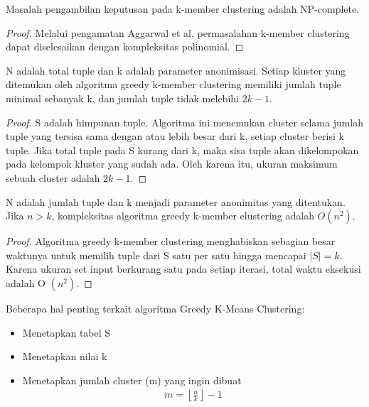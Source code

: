 \begin{theorem}
Masalah pengambilan keputusan pada k-member clustering adalah NP-complete.
\end{theorem}

\begin{proof}
Melalui pengamatan Aggarwal et al, permasalahan k-member clustering dapat diselesaikan dengan kompleksitas polinomial.
\end{proof}

\begin{theorem}
N adalah total tuple dan k adalah parameter anonimisasi. Setiap kluster yang ditemukan oleh algoritma greedy k-member clustering memiliki jumlah tuple minimal sebanyak k, dan jumlah tuple tidak melebihi $2k - 1$.
\end{theorem}

\begin{proof}
S adalah himpunan tuple. Algoritma ini menemukan cluster selama jumlah tuple yang tersisa sama dengan atau lebih besar dari k, setiap cluster berisi k tuple. Jika total tuple pada S kurang dari k, maka sisa tuple akan dikelompokan pada kelompok kluster yang sudah ada. Oleh karena itu, ukuran maksimum sebuah cluster adalah $2k - 1$.
\end{proof}

\begin{theorem}
N adalah jumlah tuple dan k menjadi parameter anonimitas yang ditentukan. Jika $n > k$, kompleksitas algoritma greedy k-member clustering adalah $O(n^2)$.
\end{theorem}

\begin{proof}
Algoritma greedy k-member clustering menghabiskan sebagian besar waktunya untuk memilih tuple dari S satu per satu hingga mencapai $|S| = k$. Karena ukuran set input berkurang satu pada setiap iterasi, total waktu eksekusi adalah O $(n^2)$.
\end{proof}

\noindent Beberapa hal penting terkait algoritma Greedy K-Means Clustering:

\begin{itemize}
\item Menetapkan tabel S  
\item Menetapkan nilai k
\item Menetapkan jumlah cluster (m) yang ingin dibuat
\begin{align}
m = \left \lfloor \frac{n}{k} \right \rfloor - 1
\end{align}
\end{itemize}



